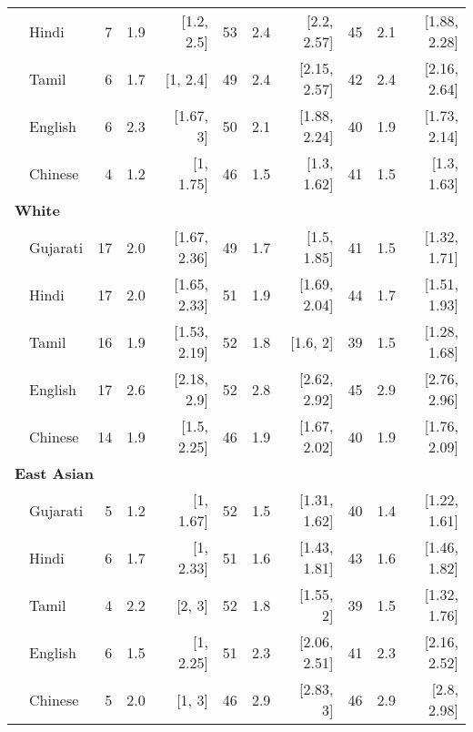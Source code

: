 \begin{table}[t]
\begin{footnotesize}
\begin{tabular}{p{.1in}lrrrrrrrrr}
 & Hindi & 7 & 1.9 & [1.2, 2.5] & 53 & 2.4 & [2.2, 2.57] & 45 & 2.1 & [1.88, 2.28]\\

& Tamil & 6 & 1.7 & [1, 2.4] & 49 & 2.4 & [2.15, 2.57] & 42 & 2.4 & [2.16, 2.64]\\

 & English & 6 & 2.3 & [1.67, 3] & 50 & 2.1 & [1.88, 2.24] & 40 & 1.9 & [1.73, 2.14]\\

& Chinese & 4 & 1.2 & [1, 1.75] & 46 & 1.5 & [1.3, 1.62] & 41 & 1.5 & [1.3, 1.63]\\
\midrule
\multicolumn{11}{l}{\textbf{White}}\\
& Gujarati & 17 & 2.0 & [1.67, 2.36] & 49 & 1.7 & [1.5, 1.85] & 41 & 1.5 & [1.32, 1.71]\\

 & Hindi & 17 & 2.0 & [1.65, 2.33] & 51 & 1.9 & [1.69, 2.04] & 44 & 1.7 & [1.51, 1.93]\\

& Tamil & 16 & 1.9 & [1.53, 2.19] & 52 & 1.8 & [1.6, 2] & 39 & 1.5 & [1.28, 1.68]\\

 & English & 17 & 2.6 & [2.18, 2.9] & 52 & 2.8 & [2.62, 2.92] & 45 & 2.9 & [2.76, 2.96]\\
 
& Chinese & 14 & 1.9 & [1.5, 2.25] & 46 & 1.9 & [1.67, 2.02] & 40 & 1.9 & [1.76, 2.09]\\

\midrule
\multicolumn{11}{l}{\textbf{East Asian}}\\
 & Gujarati & 5 & 1.2 & [1, 1.67] & 52 & 1.5 & [1.31, 1.62] & 40 & 1.4 & [1.22, 1.61]\\

 & Hindi & 6 & 1.7 & [1, 2.33] & 51 & 1.6 & [1.43, 1.81] & 43 & 1.6 & [1.46, 1.82]\\

& Tamil & 4 & 2.2 & [2, 3] & 52 & 1.8 & [1.55, 2] & 39 & 1.5 & [1.32, 1.76]\\
 & English & 6 & 1.5 & [1, 2.25] & 51 & 2.3 & [2.06, 2.51] & 41 & 2.3 & [2.16, 2.52]\\
 & Chinese & 5 & 2.0 & [1, 3] & 46 & 2.9 & [2.83, 3] & 46 & 2.9 & [2.8, 2.98]\\
\bottomrule
\end{tabular}
\end{footnotesize}
\end{table}